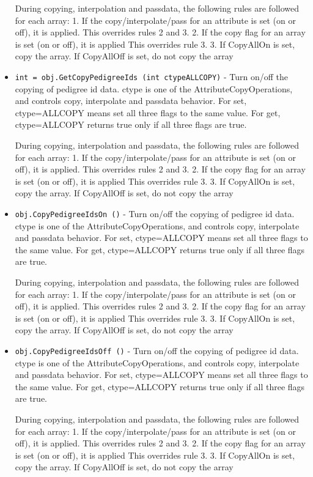 \begin{itemize}
 During copying, interpolation and passdata, the following rules are 
 followed for each array:
 1. If the copy/interpolate/pass for an attribute is set (on or off), it is applied.
    This overrides rules 2 and 3.
 2. If the copy flag for an array is set (on or off), it is applied
    This overrides rule 3.
 3. If CopyAllOn is set, copy the array.
    If CopyAllOff is set, do not copy the array

\item  \verb|int = obj.GetCopyPedigreeIds (int ctypeALLCOPY)| -  Turn on/off the copying of pedigree id data.
 ctype is one of the AttributeCopyOperations, and controls copy, 
 interpolate and passdata behavior.
 For set, ctype=ALLCOPY means set all three flags to the same value.
 For get, ctype=ALLCOPY returns true only if all three flags are true.

 During copying, interpolation and passdata, the following rules are 
 followed for each array:
 1. If the copy/interpolate/pass for an attribute is set (on or off), it is applied.
    This overrides rules 2 and 3.
 2. If the copy flag for an array is set (on or off), it is applied
    This overrides rule 3.
 3. If CopyAllOn is set, copy the array.
    If CopyAllOff is set, do not copy the array

\item  \verb|obj.CopyPedigreeIdsOn ()| -  Turn on/off the copying of pedigree id data.
 ctype is one of the AttributeCopyOperations, and controls copy, 
 interpolate and passdata behavior.
 For set, ctype=ALLCOPY means set all three flags to the same value.
 For get, ctype=ALLCOPY returns true only if all three flags are true.

 During copying, interpolation and passdata, the following rules are 
 followed for each array:
 1. If the copy/interpolate/pass for an attribute is set (on or off), it is applied.
    This overrides rules 2 and 3.
 2. If the copy flag for an array is set (on or off), it is applied
    This overrides rule 3.
 3. If CopyAllOn is set, copy the array.
    If CopyAllOff is set, do not copy the array

\item  \verb|obj.CopyPedigreeIdsOff ()| -  Turn on/off the copying of pedigree id data.
 ctype is one of the AttributeCopyOperations, and controls copy, 
 interpolate and passdata behavior.
 For set, ctype=ALLCOPY means set all three flags to the same value.
 For get, ctype=ALLCOPY returns true only if all three flags are true.

 During copying, interpolation and passdata, the following rules are 
 followed for each array:
 1. If the copy/interpolate/pass for an attribute is set (on or off), it is applied.
    This overrides rules 2 and 3.
 2. If the copy flag for an array is set (on or off), it is applied
    This overrides rule 3.
 3. If CopyAllOn is set, copy the array.
    If CopyAllOff is set, do not copy the array


\end{itemize}
